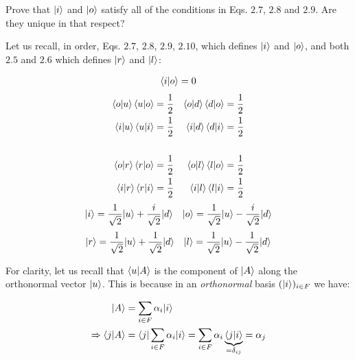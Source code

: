 \documentclass[solutions.tex]{subfiles}
\begin{document}
\maketitle
\begin{exercise}
Prove that $|i\rangle$ and $|o\rangle$ satisfy all of the
conditions in Eqs. $2.7$, $2.8$ and $2.9$. Are they unique
in that respect?
\end{exercise}
\hrr

Let us recall, in order, Eqs. $2.7$, $2.8$, $2.9$,
$2.10$, which defines $|i\rangle$ and $|o\rangle$, and both
$2.5$ and $2.6$ which defines $|r\rangle$ and $|l\rangle$:

\begin{align*}
\left\langle i \middle| o \right\rangle &= 0 \\
\end{align*}
\begin{align*}
\left\langle o \middle| u \right\rangle\left\langle u \middle| o \right\rangle &= \frac1{2} &
\left\langle o \middle| d \right\rangle\left\langle d \middle| o \right\rangle &= \frac1{2} \\
\left\langle i \middle| u \right\rangle\left\langle u \middle| i \right\rangle &= \frac1{2} &
\left\langle i \middle| d \right\rangle\left\langle d \middle| i \right\rangle &= \frac1{2} \\
~ & ~ \\
\left\langle o \middle| r \right\rangle\left\langle r \middle| o \right\rangle &= \frac1{2} &
\left\langle o \middle| l \right\rangle\left\langle l \middle| o \right\rangle &= \frac1{2} \\
\left\langle i \middle| r \right\rangle\left\langle r \middle| i \right\rangle &= \frac1{2} &
\left\langle i \middle| l \right\rangle\left\langle l \middle| i \right\rangle &= \frac1{2} \\
\end{align*}
\begin{align*}
|i\rangle &= \frac1{\sqrt2}|u\rangle + \frac{i}{\sqrt2}|d\rangle &
|o\rangle &= \frac1{\sqrt2}|u\rangle - \frac{i}{\sqrt2}|d\rangle \\
\end{align*}
\begin{align*}
|r\rangle &= \frac{1}{\sqrt2}|u\rangle + \frac{1}{\sqrt2}|d\rangle &
|l\rangle &= \frac{1}{\sqrt2}|u\rangle - \frac{1}{\sqrt2}|d\rangle \\
\end{align*}

For clarity, let us recall that $\left\langle u \middle| A \right\rangle$ is the component
of $|A\rangle$ along the orthonormal vector $|u\rangle$. This is because
in an \textit{orthonormal} basis $(|i\rangle)_{i\in F}$ we have:

\begin{align*}
|A\rangle &= \sum_{i\in F} \alpha_i|i\rangle \\
\Rightarrow \left\langle j \middle| A \right\rangle &= \langle j|\sum_{i\in F} \alpha_i|i\rangle
= \sum_{i\in F} \alpha_i\underbrace{\left\langle j \middle| i \right\rangle}_{=\delta_{ij}}
= \alpha_j
\end{align*}
\end{document}
